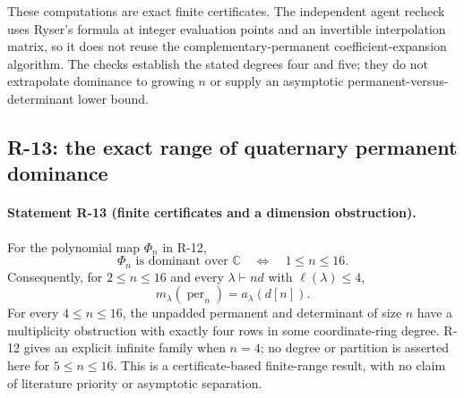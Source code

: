 \documentclass[11pt,a4paper]{article}
\theoremstyle{definition}\newtheorem{definition}{Definition}
\begin{document}
These computations are exact finite certificates. The independent
agent recheck uses Ryser's formula at integer evaluation points
and an invertible interpolation matrix, so it does not reuse
the complementary-permanent coefficient-expansion algorithm.
The checks establish the stated degrees four and five; they
do not extrapolate dominance to growing $n$ or supply an
asymptotic permanent-versus-determinant lower bound.

\subsection{R-13: the exact range of quaternary permanent dominance}

\paragraph{Statement R-13 (finite certificates and a dimension obstruction).}
For the polynomial map $\Phi_n$ in R-12,
\begin{equation}\label{R13:range}
 \Phi_n\text{ is dominant over }\mathbb C
 \quad\Longleftrightarrow\quad1\leq n\leq16.
\end{equation}
Consequently, for $2\leq n\leq16$ and every
$\lambda\vdash nd$ with $\ell(\lambda)\leq4$,
\begin{equation}\label{R13:multiplicities}
 m_\lambda(\operatorname{per}_n)=a_\lambda(d[n]).
\end{equation}
For every $4\leq n\leq16$, the unpadded permanent and determinant
of size $n$ have a multiplicity obstruction with exactly four rows
in some coordinate-ring degree. R-12 gives an explicit infinite
family when $n=4$; no degree or partition is asserted here for
$5\leq n\leq16$. This is a certificate-based finite-range result,
with no claim of literature priority or asymptotic separation.
\end{document}
